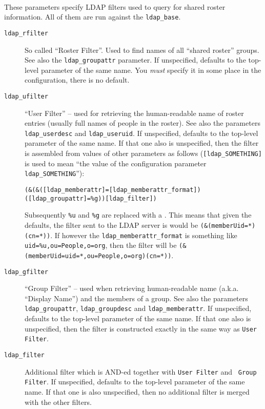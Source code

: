 \documentclass[a4paper,10pt]{book}
\newcommand{\makeparagraph}[2]{ \aname{#1}{} \paragraph{\ahrefloc{#1}{#2}} \label{#1} }
\newcommand{\bracehack}{\def\{{\char"7B}\def\}{\char"7D}}
\newcommand{\titem}[1]{\item[\bracehack\texttt{#1}]}
\begin{document}
\makeparagraph{msrlfilters}{Filters}

These parameters specify LDAP filters used to query for shared roster information.
All of them are run against the \verb|ldap_base|.

\begin{description}

 \titem{{\tt ldap\_rfilter}}
 So called ``Roster Filter''. Used to find names of all ``shared roster'' groups.
 See also the \verb|ldap_groupattr| parameter.
 If unspecified, defaults to the top-level parameter of the same name.
 You {\em must} specify it in some place in the configuration, there is no default.

 \titem{{\tt ldap\_ufilter}}
 ``User Filter'' -- used for retrieving the human-readable name of roster
 entries (usually full names of people in the roster).
 See also the parameters \verb|ldap_userdesc| and \verb|ldap_useruid|.
 If unspecified, defaults to the top-level parameter of the same name.
 If that one also is unspecified, then the filter is assembled from values of
 other parameters as follows (\verb|[ldap_SOMETHING]| is used to mean ``the
 value of the configuration parameter {\tt ldap\_SOMETHING}''):

\begin{verbatim}
(&(&([ldap_memberattr]=[ldap_memberattr_format])([ldap_groupattr]=%g))[ldap_filter])
\end{verbatim}

 Subsequently {\tt \%u} and {\tt \%g} are replaced with a {\tt *}. This means
 that given the defaults, the filter sent to the LDAP server is would be
 \verb|(&(memberUid=*)(cn=*))|.  If however the {\tt ldap\_memberattr\_format}
 is something like \verb|uid=%u,ou=People,o=org|, then the filter will be
 \verb|(&(memberUid=uid=*,ou=People,o=org)(cn=*))|.

 \titem{{\tt ldap\_gfilter}}
 ``Group Filter'' -- used when retrieving human-readable name (a.k.a.
 ``Display Name'') and the members of a group.
 See also the parameters \verb|ldap_groupattr|, \verb|ldap_groupdesc| and \verb|ldap_memberattr|.
 If unspecified, defaults to the top-level parameter of the same name.
 If that one also is unspecified, then the filter is constructed exactly in the
 same way as {\tt User Filter}.

 \titem{{\tt ldap\_filter}}
 Additional filter which is AND-ed together with {\tt User Filter} and {\tt
 Group Filter}.
 If unspecified, defaults to the top-level parameter of the same name. If that
 one is also unspecified, then no additional filter is merged with the other
 filters.
\end{description}
\end{document}
